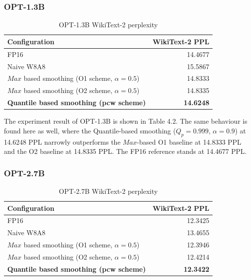 \subsubsection*{OPT-1.3B}

\begin{table}[h]
\centering
\begin{threeparttable}
\caption{OPT-1.3B WikiText-2 perplexity}
\begin{tabular}{lr}
\hline
Configuration & WikiText-2 PPL \\
\hline
FP16 & 14.4677 \\
Naive W8A8 & 15.5867 \\
$Max$ based smoothing (O1 scheme, $\alpha=0.5$) & 14.8333 \\
$Max$ based smoothing (O2 scheme, $\alpha=0.5$) & 14.8335 \\
\textbf{Quantile based smoothing (pcw scheme)} & \textbf{14.6248} \\
\hline
\end{tabular}
\end{threeparttable}
\end{table}

The experiment result of OPT-1.3B is shown in Table 4.2. The same behaviour is found here as well, where the Quantile-based smoothing ($Q_p=0.999$, $\alpha=0.9$) at 14.6248 PPL narrowly outperforms the $Max$-based O1 baseline at 14.8333 PPL and the O2 baseline at 14.8335 PPL. The FP16 reference stands at 14.4677 PPL.

\subsubsection*{OPT-2.7B}

\begin{table}[h]
\centering
\begin{threeparttable}
\caption{OPT-2.7B WikiText-2 perplexity}
\begin{tabular}{lr}
\hline
Configuration & WikiText-2 PPL \\
\hline
FP16 & 12.3425 \\
Naive W8A8 & 13.4655 \\
$Max$ based smoothing (O1 scheme, $\alpha=0.5$) & 12.3946 \\
$Max$ based smoothing (O2 scheme, $\alpha=0.5$) & 12.4214 \\
\textbf{Quantile based smoothing (pcw scheme)} & \textbf{12.3422} \\
\hline
\end{tabular}
\end{threeparttable}
\end{table}

